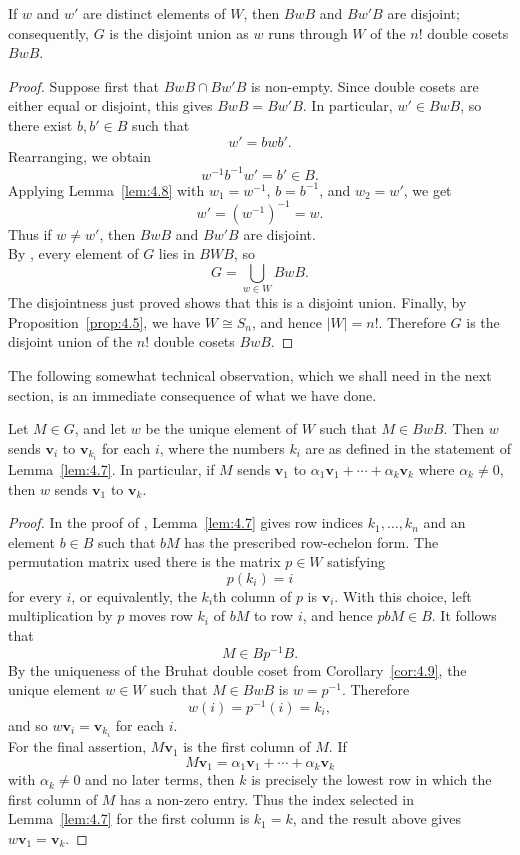 \documentclass[../Odyssey_Project.tex]{subfiles}
\begin{document}
\begin{corollary}
\label{cor:4.9}
If $w$ and $w'$ are distinct elements of $W$, then $BwB$ and $Bw'B$ are disjoint; consequently, $G$ is the disjoint union as $w$ runs through $W$ of the $n!$ double cosets $BwB$.
\end{corollary}

\begin{proof}
Suppose first that $BwB\cap Bw'B$ is non-empty. Since double cosets are either equal or disjoint, this gives $BwB=Bw'B$. In particular, $w'\in BwB$, so there exist $b,b'\in B$ such that
\[
    w'=bwb'.
\]
Rearranging, we obtain
\[
    w^{-1}b^{-1}w'=b'\in B.
\]
Applying Lemma~\ref{lem:4.8} with $w_1=w^{-1}$, $b=b^{-1}$, and $w_2=w'$, we get
\[
    w'=(w^{-1})^{-1}=w.
\]
Thus if $w\neq w'$, then $BwB$ and $Bw'B$ are disjoint.\\
By , every element of $G$ lies in $BWB$, so
\[
    G=\bigcup_{w\in W} BwB.
\]
The disjointness just proved shows that this is a disjoint union. Finally, by Proposition~\ref{prop:4.5}, we have $W\cong S_n$, and hence $|W|=n!$. Therefore $G$ is the disjoint union of the $n!$ double cosets $BwB$.
\end{proof}
The following somewhat technical observation, which we shall need in the next section, is an immediate consequence of what we have done.
\begin{corollary}
\label{cor:4.10}
Let $M \in G$, and let $w$ be the unique element of $W$ such that $M \in BwB$. Then $w$ sends $\mathbf{v}_i$ to $\mathbf{v}_{k_i}$ for each $i$, where the numbers $k_i$ are as defined in the statement of Lemma~\ref{lem:4.7}. In particular, if $M$ sends $\mathbf{v}_1$ to $\alpha_1 \mathbf{v}_1 + \cdots + \alpha_k \mathbf{v}_k$ where $\alpha_k \neq 0$, then $w$ sends $\mathbf{v}_1$ to $\mathbf{v}_k$.
\end{corollary}

\begin{proof}
In the proof of , Lemma~\ref{lem:4.7} gives row indices $k_1,\ldots,k_n$ and an element $b\in B$ such that $bM$ has the prescribed row-echelon form. The permutation matrix used there is the matrix $p\in W$ satisfying
\[
    p(k_i)=i
\]
for every $i$, or equivalently, the $k_i$th column of $p$ is $\mathbf{v}_i$. With this choice, left multiplication by $p$ moves row $k_i$ of $bM$ to row $i$, and hence $pbM\in B$. It follows that
\[
    M\in Bp^{-1}B.
\]
By the uniqueness of the Bruhat double coset from Corollary~\ref{cor:4.9}, the unique element $w\in W$ such that $M\in BwB$ is $w=p^{-1}$. Therefore
\[
    w(i)=p^{-1}(i)=k_i,
\]
and so $w\mathbf{v}_i=\mathbf{v}_{k_i}$ for each $i$.\\
For the final assertion, $M\mathbf{v}_1$ is the first column of $M$. If
\[
    M\mathbf{v}_1=\alpha_1\mathbf{v}_1+\cdots+\alpha_k\mathbf{v}_k
\]
with $\alpha_k\neq 0$ and no later terms, then $k$ is precisely the lowest row in which the first column of $M$ has a non-zero entry. Thus the index selected in Lemma~\ref{lem:4.7} for the first column is $k_1=k$, and the result above gives $w\mathbf{v}_1=\mathbf{v}_k$.
\end{proof}
\end{document}

